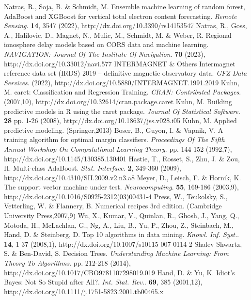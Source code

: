 \let\LaTeXcline\cline\documentclass[sn-mathphys-num]{sn-jnl}\let\cline\LaTeXcline
\begin{document}
\begin{thebibliography}{00}
Natras, R., Soja, B. \& Schmidt, M. Ensemble machine learning of random forest, AdaBoost and XGBoost for vertical total electron content forecasting. {\em Remote Sensing}. \textbf{14}, 3547 (2022), http://dx.doi.org/10.3390/rs14153547
Natras, R., Goss, A., Halilovic, D., Magnet, N., Mulic, M., Schmidt, M. \& Weber, R. Regional ionosphere delay models based on CORS data and machine learning. {\em NAVIGATION: Journal Of The Institute Of Navigation}. \textbf{70} (2023), http://dx.doi.org/10.33012/navi.577
INTERMAGNET \& Others Intermagnet reference data set (IRDS) 2019 – definitive magnetic observatory data. {\em GFZ Data Services}. (2022), http://dx.doi.org/10.5880/INTERMAGNET.1991.2019
Kuhn, M. caret: Classification and Regression Training. {\em CRAN: Contributed Packages}. (2007,10), http://dx.doi.org/10.32614/cran.package.caret
Kuhn, M. Building predictive models in R using the caret package. {\em Journal Of Statistical Software}. \textbf{28} pp. 1-26 (2008), http://dx.doi.org/10.18637/jss.v028.i05
Kuhn, M. Applied predictive modeling. (Springer,2013)
Boser, B., Guyon, I. \& Vapnik, V. A training algorithm for optimal margin classifiers. {\em Proceedings Of The Fifth Annual Workshop On Computational Learning Theory}. pp. 144-152 (1992,7), http://dx.doi.org/10.1145/130385.130401
Hastie, T., Rosset, S., Zhu, J. \& Zou, H. Multi-class AdaBoost. {\em Stat. Interface}. \textbf{2}, 349-360 (2009), http://dx.doi.org/10.4310/SII.2009.v2.n3.a8
Meyer, D., Leisch, F. \& Hornik, K. The support vector machine under test. {\em Neurocomputing}. \textbf{55}, 169-186 (2003,9), http://dx.doi.org/10.1016/S0925-2312(03)00431-4
Press, W., Teukolsky, S., Vetterling, W. \& Flannery, B. Numerical recipes 3rd edition. (Cambridge University Press,2007,9)
Wu, X., Kumar, V., Quinlan, R., Ghosh, J., Yang, Q., Motoda, H., McLachlan, G., Ng, A., Liu, B., Yu, P., Zhou, Z., Steinbach, M., Hand, D. \& Steinberg, D. Top 10 algorithms in data mining. {\em Knowl. Inf. Syst.}. \textbf{14}, 1-37 (2008,1), http://dx.doi.org/10.1007/s10115-007-0114-2
Shalev-Shwartz, S. \& Ben-David, S. Decision Trees. {\em Understanding Machine Learning: From Theory To Algorithms}. pp. 212-218 (2014), http://dx.doi.org/10.1017/CBO9781107298019.019
Hand, D. \& Yu, K. Idiot's Bayes: Not So Stupid after All?. {\em Int. Stat. Rev.}. \textbf{69}, 385 (2001,12), http://dx.doi.org/10.1111/j.1751-5823.2001.tb00465.x

\end{thebibliography}
\end{document}
